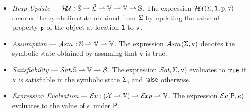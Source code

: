 \begin{itemize}
   \item \emph{Heap Update} --- $\mathcal{H\!U}_{} : \mathbb{S} \rightharpoonup \hat{\mathcal{L}} \rightharpoonup \mathbb{V} \rightharpoonup \mathbb{V} \rightharpoonup \mathbb{S}$. 
             The expression $\mathcal{H\!U}_{}(\Sigma, \mathtt{l}, \mathtt{p}, \mathtt{v})$ denotes the symbolic state obtained from $\Sigma$ 
             by  updating the value of property $\mathtt{p}$ of the object at location $\mathtt{l}$ to $\mathtt{v}$. 
   
   \item \emph{Assumption} --- $\mathcal{A}{sm}_{} : \mathbb{S} \rightharpoonup \mathbb{V} \rightharpoonup \mathbb{V}$. 
            The expression $\mathcal{A}{sm}_{}(\Sigma, \mathtt{v})$ denotes the symbolic state obtained by assuming that 
             $\mathtt{v}$ is true. 
  
   \item \emph{Satisfiability} --- $\mathcal{S}at_{:} \mathbb{S} \rightharpoonup \mathbb{V} \rightharpoonup \mathcal{B}$. 
            The expression $\mathcal{S}at_{(}\Sigma, \mathtt{v})$ evaluates to ${\sf true}$ if $\mathtt{v}$ is satisfiable in the symbolic 
            state $\Sigma$, and ${\sf false}$ otherwise. 
    
    \item \emph{Expression Evaluation} --- $\mathcal{E}v_{} :  (\mathcal{X} \rightharpoonup \mathbb{V})  \rightharpoonup \mathcal{E}xp \rightharpoonup \mathbb{V}$. 
            The expression $\mathcal{E}v_{}({\sf P}, e)$ evaluates to the value of $e$ under ${\sf P}$. 
\end{itemize}


